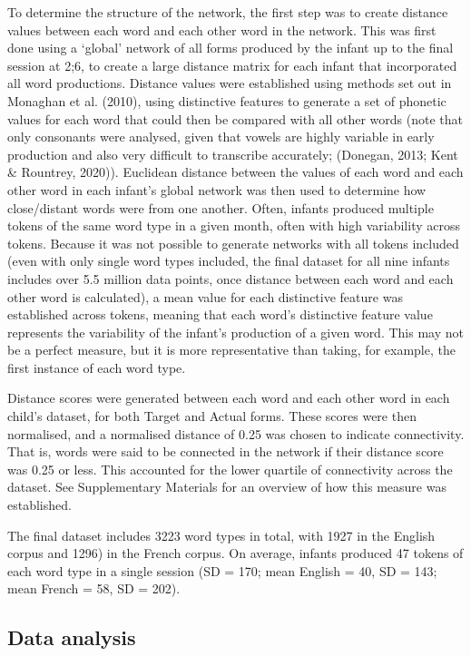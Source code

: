 \documentclass[
  man]{apa6}
\begin{document}
To determine the structure of the network, the first step was to create distance values between each word and each other word in the network. This was first done using a `global' network of all forms produced by the infant up to the final session at 2;6, to create a large distance matrix for each infant that incorporated all word productions. Distance values were established using methods set out in Monaghan et al. (2010), using distinctive features to generate a set of phonetic values for each word that could then be compared with all other words (note that only consonants were analysed, given that vowels are highly variable in early production and also very difficult to transcribe accurately; (Donegan, 2013; Kent \& Rountrey, 2020)). Euclidean distance between the values of each word and each other word in each infant's global network was then used to determine how close/distant words were from one another. Often, infants produced multiple tokens of the same word type in a given month, often with high variability across tokens. Because it was not possible to generate networks with all tokens included (even with only single word types included, the final dataset for all nine infants includes over 5.5 million data points, once distance between each word and each other word is calculated), a mean value for each distinctive feature was established across tokens, meaning that each word's distinctive feature value represents the variability of the infant's production of a given word. This may not be a perfect measure, but it is more representative than taking, for example, the first instance of each word type.

Distance scores were generated between each word and each other word in each child's dataset, for both Target and Actual forms. These scores were then normalised, and a normalised distance of 0.25 was chosen to indicate connectivity. That is, words were said to be connected in the network if their distance score was 0.25 or less. This accounted for the lower quartile of connectivity across the dataset. See Supplementary Materials for an overview of how this measure was established.

The final dataset includes 3223 word types in total, with 1927 in the English corpus and 1296) in the French corpus. On average, infants produced 47 tokens of each word type in a single session (SD = 170; mean English = 40, SD = 143; mean French = 58, SD = 202).

\hypertarget{data-analysis}{%
\subsection{Data analysis}\label{data-analysis}}
\end{document}
